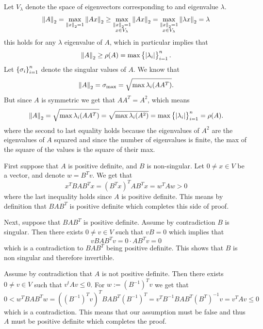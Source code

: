\documentclass[11pt, a4paper]{article}
\begin{document}
\begin{solution} \phantom{}
  \item[(1)] Let $V_\lambda$ denote the space of eigenvectors corresponding to
  and eigenvalue $\lambda$.
  \[
    \left\lVert A\right\rVert_2 =
    \max_{\left\lVert x\right\rVert_2=1} \left\lVert Ax\right\rVert_2 \geq
    \max_{\substack{\left\lVert x\right\rVert_2=1 \\ x \in V_\lambda}} \left\lVert Ax\right\rVert_2 =
    \max_{\substack{\left\lVert x\right\rVert_2=1 \\ x \in V_\lambda}} \left\lVert\lambda x\right\rVert_2 = \lambda
  \]
  this holds for any $\lambda$ eigenvalue of $A$,
  which in particular implies that
  \[
    \left\lVert A\right\rVert_2 \geq \rho(A) = \max\left\{\left\lvert\lambda_i\right\rvert\right\}_{i=1}^{n}.
  \]
  Let $\left\{\sigma_i\right\}_{i=1}^{n}$ denote the singular values of $A$.
  We know that
  \[
    \left\lVert A\right\rVert_{2} = \sigma_{\max} = \sqrt{\max \lambda_i(A A^T)}.
  \]
  But since $A$ is symmetric we get that $A A^T = A^2$, which means
  \[
    \left\lVert A\right\rVert_{2} =
    \sqrt{\max \lambda_i(A A^T)} =
    \sqrt{\max \lambda_i(A^2)} =
    \max\left\{\left\lvert\lambda_i\right\rvert\right\}_{i=1}^{n} =
    \rho(A).
  \]
  where the second to last equality holds because
  the eigenvalues of $A^2$ are the eigenvalues of $A$ squared
  and since the number of eigenvalues is finite,
  the max of the square of the values is the square of their max.
  \item[(2)] First suppose that $A$ is positive definite, and $B$ is
    non-singular.
    Let $0 \neq x \in V$ be a vector, and denote $w = B^T v$.
    We get that
    \[
      x^T B A B^T x =
      (B^T x)^T A B^T x =
      w^T A w > 0
    \]
    where the last inequality holds since $A$ is positive definite.
    This means by definition that $B A B^T$ is positive definite
    which completes this side of proof.

    Next, suppose that $B A B^T$ is positive definite.
    Assume by contradiction $B$ is singular.
    Then there exists $0 \neq v \in V$ such that $v B = 0$
    which implies that
    \[
      v B A B^T v = 0 \cdot A B^T v = 0
    \]
    which is a contradiction to $B A B^T$ being positive definite.
    This shows that $B$ is non singular and therefore invertible.
    
    Assume by contradiction that $A$ is not positive definite.
    Then there exists $0 \neq v \in V$ such that $v^t A v \leq 0$.
    For $w := (B^{-1})^T v$ we get that
    \[
      0 < w^T B A B^T w =
      ((B^{-1})^T v)^T B A B^T (B^{-1})^T =
      v^T B^{-1} B A B^T (B^T)^{-1} v =
      v^TA v \leq 0
    \]
    which is a contradiction.
    This means that our assumption must be false and thus $A$ must be
    positive definite which completes the proof.
\end{solution}
\end{document}
